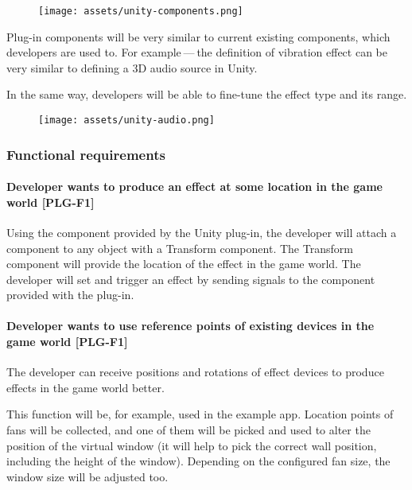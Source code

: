 \begin{figure}[h]{}
\centering\texttt{[image: assets/unity-components.png]}
\caption{}

\end{figure}

Plug-in components will be very similar to current existing components, which
developers are used to. For example — the definition of vibration effect can be
very similar to defining a 3D audio source in Unity.


In the same way, developers will be able to fine-tune the effect type and
its range.


\begin{figure}[h]{}
\centering\texttt{[image: assets/unity-audio.png]}
\caption{}

\end{figure}

\hypertarget{x-functional-requirements}{\subsubsection*{Functional requirements}}
\hypertarget{x-\textbf{developer-wants-to-produce-an-effect-at-some-location-in-the-game-world}-[plg-f1]}{\paragraph*{\textbf{Developer wants to produce an effect at some location in the game world} [PLG-F1]}}
Using the component provided by the Unity plug-in, the developer will attach
a component to any object with a Transform component. The Transform component
will provide the location of the effect in the game world. The developer will
set and trigger an effect by sending signals to the component provided with
the plug-in.


\hypertarget{x-\textbf{developer-wants-to-use-reference-points-of-existing-devices-in-the-game-world}-[plg-f1]}{\paragraph*{\textbf{Developer wants to use reference points of existing devices in the game world} [PLG-F1]}}
The developer can receive
positions and rotations of effect devices to produce effects in the
game world better.


This function will be, for example, used in the example app. Location points of
fans will be collected, and one of them will be picked and used to alter
the position of the virtual window (it will help to pick the correct wall position,
including the height of the window). Depending on the configured fan size,
the window size will be adjusted too.


